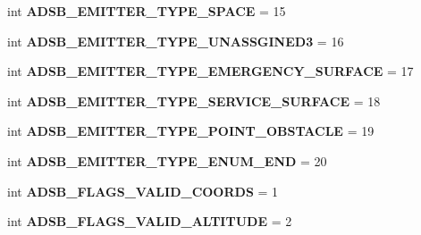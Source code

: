 \begin{DoxyCompactItemize}
\item 
\mbox{\label{namespacepymavlink_1_1dialects_1_1v10_a57ca833406673665c20bc080fd685b5a}} 
int {\bfseries A\+D\+S\+B\+\_\+\+E\+M\+I\+T\+T\+E\+R\+\_\+\+T\+Y\+P\+E\+\_\+\+S\+P\+A\+CE} = 15
\item 
\mbox{\label{namespacepymavlink_1_1dialects_1_1v10_a51085a64d78d97179c683fb931c81397}} 
int {\bfseries A\+D\+S\+B\+\_\+\+E\+M\+I\+T\+T\+E\+R\+\_\+\+T\+Y\+P\+E\+\_\+\+U\+N\+A\+S\+S\+G\+I\+N\+E\+D3} = 16
\item 
\mbox{\label{namespacepymavlink_1_1dialects_1_1v10_a4096ad63d80be1683f332cbe511e1e5c}} 
int {\bfseries A\+D\+S\+B\+\_\+\+E\+M\+I\+T\+T\+E\+R\+\_\+\+T\+Y\+P\+E\+\_\+\+E\+M\+E\+R\+G\+E\+N\+C\+Y\+\_\+\+S\+U\+R\+F\+A\+CE} = 17
\item 
\mbox{\label{namespacepymavlink_1_1dialects_1_1v10_a8558d51080795674d196ae2931b6e8a3}} 
int {\bfseries A\+D\+S\+B\+\_\+\+E\+M\+I\+T\+T\+E\+R\+\_\+\+T\+Y\+P\+E\+\_\+\+S\+E\+R\+V\+I\+C\+E\+\_\+\+S\+U\+R\+F\+A\+CE} = 18
\item 
\mbox{\label{namespacepymavlink_1_1dialects_1_1v10_a9e4f4e7448bbaf0934254f6c9010b606}} 
int {\bfseries A\+D\+S\+B\+\_\+\+E\+M\+I\+T\+T\+E\+R\+\_\+\+T\+Y\+P\+E\+\_\+\+P\+O\+I\+N\+T\+\_\+\+O\+B\+S\+T\+A\+C\+LE} = 19
\item 
\mbox{\label{namespacepymavlink_1_1dialects_1_1v10_a4477d9214cf69c23a47ab56b9e6d12a6}} 
int {\bfseries A\+D\+S\+B\+\_\+\+E\+M\+I\+T\+T\+E\+R\+\_\+\+T\+Y\+P\+E\+\_\+\+E\+N\+U\+M\+\_\+\+E\+ND} = 20
\item 
\mbox{\label{namespacepymavlink_1_1dialects_1_1v10_a7322e850b0d31715e9ff5bf46d9d69c4}} 
int {\bfseries A\+D\+S\+B\+\_\+\+F\+L\+A\+G\+S\+\_\+\+V\+A\+L\+I\+D\+\_\+\+C\+O\+O\+R\+DS} = 1
\item 
\mbox{\label{namespacepymavlink_1_1dialects_1_1v10_a5fa9b64d1aebe4f51d13d761f46b8300}} 
int {\bfseries A\+D\+S\+B\+\_\+\+F\+L\+A\+G\+S\+\_\+\+V\+A\+L\+I\+D\+\_\+\+A\+L\+T\+I\+T\+U\+DE} = 2

\end{DoxyCompactItemize}
